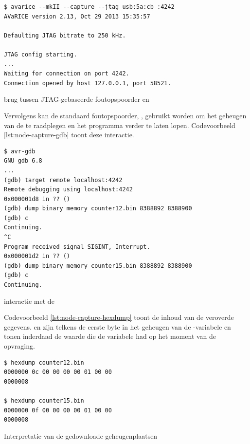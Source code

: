 \begin{listing}[ht]
  \begin{verbatim}
$ avarice --mkII --capture --jtag usb:5a:cb :4242
AVaRICE version 2.13, Oct 29 2013 15:35:57

Defaulting JTAG bitrate to 250 kHz.

JTAG config starting.
...
Waiting for connection on port 4242.
Connection opened by host 127.0.0.1, port 58521.
  \end{verbatim}
  \vspace{-5mm}
  \caption{ brug tussen JTAG-gebaseerde foutopspoorder en }
  \label{lst:node-capture-avarice}
\end{listing}

Vervolgens kan de standaard foutopspoorder, , gebruikt worden om het
geheugen van de \mcu te raadplegen en het programma verder te laten lopen.
Codevoorbeeld \ref{lst:node-capture-gdb} toont deze interactie.

\begin{listing}[ht]
  \begin{verbatim}
$ avr-gdb
GNU gdb 6.8
...
(gdb) target remote localhost:4242
Remote debugging using localhost:4242
0x000001d8 in ?? ()
(gdb) dump binary memory counter12.bin 8388892 8388900
(gdb) c
Continuing.
^C
Program received signal SIGINT, Interrupt.
0x000001d2 in ?? ()
(gdb) dump binary memory counter15.bin 8388892 8388900
(gdb) c
Continuing.
  \end{verbatim}
  \vspace{-5mm}
  \caption{ interactie met de \mcu}
  \label{lst:node-capture-gdb}
\end{listing}

Codevoorbeeld \ref{lst:node-capture-hexdump} toont de inhoud van de veroverde
gegevens.  en  zijn telkens de eerste byte in het geheugen van
de -variabele en tonen inderdaad de waarde die de variabele had op
het moment van de opvraging.

\begin{listing}[ht]
  \begin{verbatim}
$ hexdump counter12.bin 
0000000 0c 00 00 00 00 01 00 00                        
0000008

$ hexdump counter15.bin 
0000000 0f 00 00 00 00 01 00 00                        
0000008
  \end{verbatim}
  \vspace{-5mm}
  \caption{Interpretatie van de gedownloade geheugenplaatsen}
  \label{lst:node-capture-hexdump}
\end{listing}

